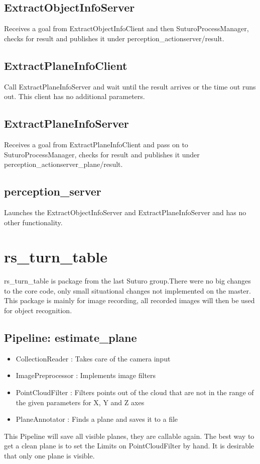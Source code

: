 \documentclass[main.tex]{subfiles}
\begin{document}
			\subsection{ExtractObjectInfoServer}
Receives a goal from ExtractObjectInfoClient and then SuturoProcessManager, checks for result and publishes it under perception\_actionserver/result. 

			\subsection{ExtractPlaneInfoClient}
Call ExtractPlaneInfoServer and wait until the result arrives or the time out runs out. This client has no additional parameters.

			\subsection{ExtractPlaneInfoServer}
Receives a goal from ExtractPlaneInfoClient and pass on to SuturoProcessManager, checks for result and publishes it under perception\_actionserver\_plane/result.

			\subsection{perception\_server}
Launches the ExtractObjectInfoServer and ExtractPlaneInfoServer and has no other functionality.

		\section{rs\_turn\_table}
rs\_turn\_table is package from the last Suturo group.There were no big changes to the core code, only small situational changes not implemented on the master. 
This package is mainly for image recording, all recorded images will then be used for object recognition.  
			\subsection{Pipeline: estimate\_plane}
\begin{itemize}
	\item CollectionReader : Takes care of the camera input
	\item ImagePreprocessor : Implements image filters  
	\item PointCloudFilter : Filters points out of the cloud that are not in the range of the given parameters for X, Y and Z axes
	\item PlaneAnnotator : Finds a plane and saves it to a file 
\end{itemize}
This Pipeline will save all visible planes, they are callable again. The best way to get a clean plane is to set the Limits on PointCloudFilter by hand. It is desirable that only one plane is visible. 
\end{document}
